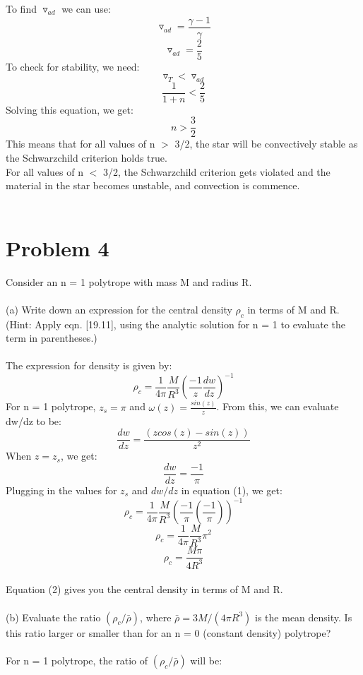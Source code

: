 \documentclass[10pt]{article}
\begin{document}
To find $\triangledown_{ad}$ we can use:
\[ \triangledown_{ad} = \frac{\gamma - 1}{\gamma}\]
\[ \triangledown_{ad} = \frac{2}{5}\]
To check for stability, we need:
\[ \triangledown_{T} < \triangledown_{ad}\]
\[ \frac{1}{1+n} < \frac{2}{5}\]
Solving this equation, we get:
\[ n > \frac{3}{2}\]
This means that for all values of n $>$ 3/2, the star will be convectively stable as the Schwarzchild criterion holds true.\\
For all values of n $<$ 3/2, the Schwarzchild criterion gets violated and the material in the star becomes unstable, and convection is commence.
\\ \\
\section*{Problem 4}
Consider an n = 1 polytrope with mass M and radius R.\\ \\
(a) Write down an expression for the central density $\rho_{c}$ in terms of M and R. (Hint: Apply eqn. [19.11], using the analytic solution for n = 1 to evaluate the term in parentheses.) \\ \\
The expression for density is given by:
\begin{equation}
   \rho_{c} = \frac{1}{4 \pi} \frac{M}{R^3} (\frac{-1}{z} \frac{dw}{dz})^{-1}   \tag{1}
\end{equation}
For n = 1 polytrope, $z_{s} = \pi$ and $\omega(z) = \frac{sin(z)}{z}$. From this, we can evaluate dw/dz to be:
\[ \frac{dw}{dz} = \frac{(z cos(z) - sin(z))}{z^2}\]
When $z = z_{s}$, we get:
\[ \frac{dw}{dz} = \frac{-1}{\pi}\]
Plugging in the values for $z_{s}$ and $dw/dz$ in equation (1), we get:
\[ \rho_{c} = \frac{1}{4\pi} \frac{M}{R^3} \left(\frac{-1}{\pi} \left(\frac{-1}{\pi}\right)\right)^{-1}\]
\[ \rho_{c} = \frac{1}{4\pi} \frac{M}{R^3} \pi^2\]
\begin{equation}
    \rho_{c} = \frac{M \pi}{4 R^3}  \tag{2}
\end{equation}
\\
Equation (2) gives you the central density in terms of M and R.
\\ \\
(b) Evaluate the ratio $(\rho_{c}/\bar{\rho})$, where $\bar{\rho} = 3M/(4 \pi R^3)$ is the mean density. Is this ratio larger or smaller than for an n = 0 (constant density) polytrope?\\ \\
For n = 1 polytrope, the ratio of $(\rho_{c}/\bar{\rho})$ will be:
\end{document}
